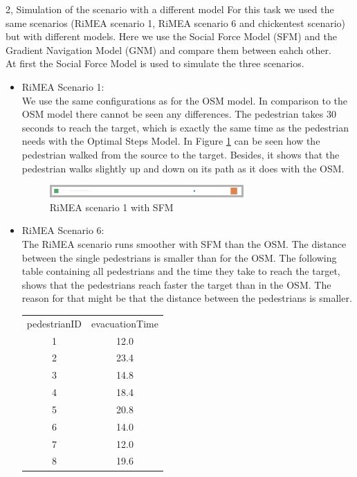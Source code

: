 \documentclass[10pt,a4paper]{article}
\begin{document}
\begin{task}{2, Simulation of the scenario with a different model}
For this task we used the same scenarios (RiMEA scenario 1, RiMEA scenario 6 and chickentest scenario) but with different models. Here we use the Social Force Model (SFM) and the Gradient Navigation Model (GNM) and compare them between eahch other.\\
At first the Social Force Model is used to simulate the three scenarios.
\begin{itemize}
    \item RiMEA Scenario 1:\\
    We use the same configurations as for the OSM model. In comparison to the OSM model there cannot be seen any differences. The pedestrian takes 30 seconds to reach the target, which is exactly the same time as the pedestrian needs with the Optimal Steps Model. In Figure \ref{fig:rimea1_sfm} can be seen how the pedestrian walked from the source to the target. Besides, it shows that the pedestrian walks slightly up and down on its path as it does with the OSM.
    \begin{figure}[H]
        \centering
        \includegraphics[width=0.7\textwidth]{pictures/sfm/rimeatest1.png}
        \caption{RiMEA scenario 1 with SFM}
        \label{fig:rimea1_sfm}
    \end{figure}
    \item RiMEA Scenario 6:\\
    The RiMEA scenario runs smoother with SFM than the OSM. The distance between the single pedestrians is smaller than for the OSM. The following table containing all pedestrians and the time they take to reach the target, shows that the pedestrians reach faster the target than in the OSM. The reason for that might be that the distance between the pedestrians is smaller.
    \bigbreak
    \begin{tabular}{c|c}
    pedestrianID&evacuationTime\\
         1&  12.0\\
         2& 23.4\\
         3&14.8\\
         4&18.4\\
         5&20.8\\
         6&14.0\\
         7&12.0\\
         8&19.6\\

\end{tabular}
\end{itemize}
\end{task}
\end{document}
